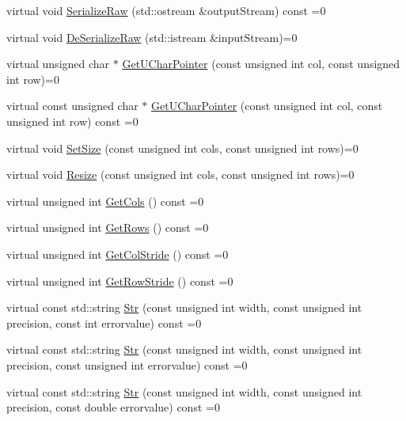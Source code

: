 \begin{DoxyCompactItemize}
\item 
virtual void \hyperlink{classsvl_sample_matrix_acd4b2584ba05baa047abebd0b074ce04}{Serialize\+Raw} (std\+::ostream \&output\+Stream) const =0
\item 
virtual void \hyperlink{classsvl_sample_matrix_aa57e6d8ca556b52e70b6e94e3e962cfd}{De\+Serialize\+Raw} (std\+::istream \&input\+Stream)=0
\item 
virtual unsigned char $\ast$ \hyperlink{classsvl_sample_matrix_a3796f625eb8a13b9ab34594c0bd6903f}{Get\+U\+Char\+Pointer} (const unsigned int col, const unsigned int row)=0
\item 
virtual const unsigned char $\ast$ \hyperlink{classsvl_sample_matrix_a85aed650f106fe6ba80a83c199f6e62b}{Get\+U\+Char\+Pointer} (const unsigned int col, const unsigned int row) const =0
\item 
virtual void \hyperlink{classsvl_sample_matrix_a05a7e2b19460721298dd6d7a89417ac0}{Set\+Size} (const unsigned int cols, const unsigned int rows)=0
\item 
virtual void \hyperlink{classsvl_sample_matrix_a4f8dad9eff0dec6a5b6b5d8485740ec6}{Resize} (const unsigned int cols, const unsigned int rows)=0
\item 
virtual unsigned int \hyperlink{classsvl_sample_matrix_aacea8828c46342864637f6255dd227dc}{Get\+Cols} () const =0
\item 
virtual unsigned int \hyperlink{classsvl_sample_matrix_a405709c0faf794990cb5adede9dfcbe2}{Get\+Rows} () const =0
\item 
virtual unsigned int \hyperlink{classsvl_sample_matrix_a533753ff374582e6672e57276cb5556d}{Get\+Col\+Stride} () const =0
\item 
virtual unsigned int \hyperlink{classsvl_sample_matrix_a8cd12553074481ae0955935476bfe783}{Get\+Row\+Stride} () const =0
\item 
virtual const std\+::string \hyperlink{classsvl_sample_matrix_ad5ceba0a2fd08724bb26a8f397fc9345}{Str} (const unsigned int width, const unsigned int precision, const int errorvalue) const =0
\item 
virtual const std\+::string \hyperlink{classsvl_sample_matrix_a09092eea578d4ea86be946cef83bfa1d}{Str} (const unsigned int width, const unsigned int precision, const unsigned int errorvalue) const =0
\item 
virtual const std\+::string \hyperlink{classsvl_sample_matrix_a77a4b024a006e79ca1e0f5b3769fe260}{Str} (const unsigned int width, const unsigned int precision, const double errorvalue) const =0
\item 

\end{DoxyCompactItemize}
